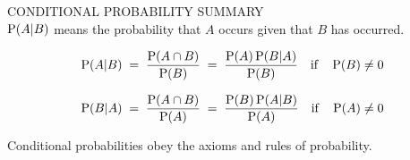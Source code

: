 \begin{framed}
CONDITIONAL PROBABILITY SUMMARY\\

$\P(A|B)$ means the probability that $A$ occurs given that $B$ has
occurred.

$$\P(A|B)\;=\;\frac{\P(A\cap B)}{\P(B)}\;=\;\frac{\P(A)\P(B|A)}{\P(B)}\quad \textrm{if}\quad \P(B)\neq0$$

$$\P(B|A)\;=\;\frac{\P(A\cap B)}{\P(A)}\;=\;\frac{\P(B)\P(A|B)}{\P(A)}\quad \textrm{if}\quad \P(A)\neq 0$$

Conditional probabilities obey the axioms and rules of probability.
\end{framed}


